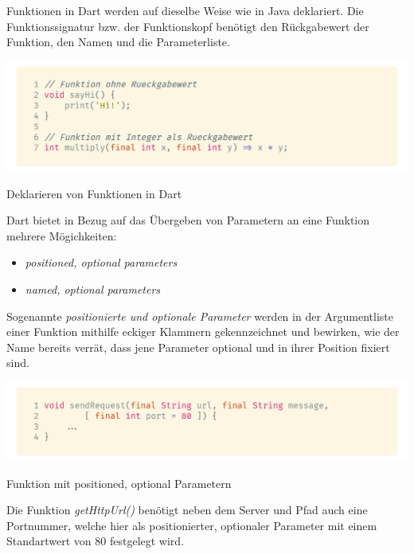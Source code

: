 Funktionen in Dart werden auf dieselbe Weise wie in Java deklariert. Die Funktionssignatur bzw. der Funktionskopf benötigt den Rückgabewert der Funktion, den Namen und die Parameterliste.

\begin{code}[h]
    \centering
    \includegraphics[width=1\textwidth]{images/Dart/theory/dartFunctions.png}
    \vspace{-25pt}
    \caption{Deklarieren von Funktionen in Dart}
\end{code}

\newpage

Dart bietet in Bezug auf das Übergeben von Parametern an eine Funktion mehrere Mögichkeiten:

\begin{itemize}
    \item \textit{positioned, optional parameters}
    \item \textit{named, optional parameters}
\end{itemize}

Sogenannte \textit{positionierte und optionale Parameter} werden in der Argumentliste einer Funktion mithilfe eckiger Klammern gekennzeichnet und bewirken, wie der Name bereits verrät, dass jene Parameter optional und in ihrer Position fixiert sind.

\begin{code}
    \centering
    \includegraphics[width=1\textwidth]{images/Dart/theory/dartPositionedArgumentsFunction.png}
    \vspace{-25pt}
    \caption{Funktion mit positioned, optional Parametern}
\end{code}

Die Funktion \textit{getHttpUrl()} benötigt neben dem Server und Pfad auch eine Portnummer, welche hier als positionierter, optionaler Parameter mit einem Standartwert von 80 festgelegt wird.

